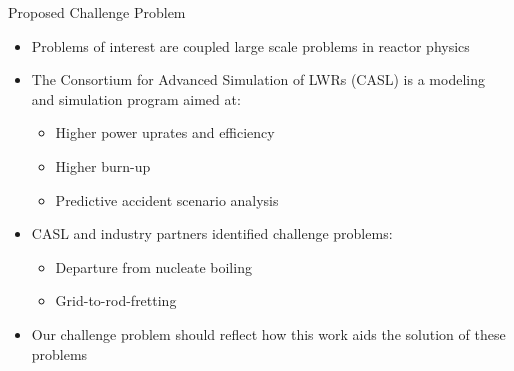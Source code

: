 \documentclass{beamer}
\begin{document}
\begin{frame}{Proposed Challenge Problem}

  \begin{itemize}
  \item Problems of interest are coupled large scale problems in
    reactor physics
  \item The Consortium for Advanced Simulation of LWRs (CASL) is a
    modeling and simulation program aimed at:
    \begin{itemize}
      \item Higher power uprates and efficiency
      \item Higher burn-up
      \item Predictive accident scenario analysis
    \end{itemize}
  \item CASL and industry partners identified challenge problems:
    \begin{itemize}
    \item Departure from nucleate boiling
    \item Grid-to-rod-fretting
    \end{itemize}
  \item Our challenge problem should reflect how this work aids the
    solution of these problems
  \end{itemize}

\end{frame}
\end{document}
